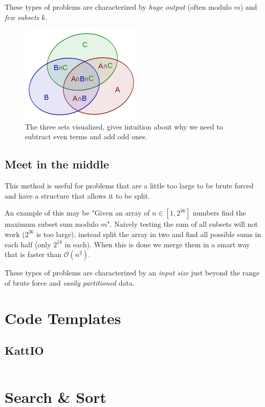 \documentclass[8pt,a4paper,landscape,oneside]{amsart}
\newcommand{\code}[1]{\inputminted[fontsize=\normalsize,baselinestretch=1]{java}{code/#1}}
\newcommand{\bigO}{\mathcal{O}}
\begin{document}
\begin{multicols*}{3}
  These types of problems are characterized by \emph{huge output} (often modulo $m$) and \emph{few subsets} $k$.
  
  \begin{figure}[H]
  \centering
   \includegraphics[scale=0.5]{inclusion-exclusion_principle.png}
   \caption{The three sets visualized, gives intuition about why we need to subtract even terms and add odd ones.}
   \label{inclusion-exclusion}
  \end{figure}
  
  \subsection{Meet in the middle}
  This method is useful for problems that are a little too large to be brute forced and have a structure that allows it to be split. 
  
  An example of this may be "Given an array of $n \in [1, 2^{36}]$ numbers find the maximum subset sum modulo $m$". Naively testing the sum of all subsets will not work ($2^{36}$ is too large), instead split the array in two and find all possible sums in each half (only $2^{18}$ in each). When this is done we merge them in a smart way that is faster than $\bigO(n^2)$.
  
  These types of problems are characterized by an \emph{input size} just beyond the range of brute force and \emph{easily partitioned} data.


\section{Code Templates}
  \subsection{KattIO}
  \code{Kattio.java}
  
  
\section{Search \& Sort}

\end{multicols*}
\end{document}
